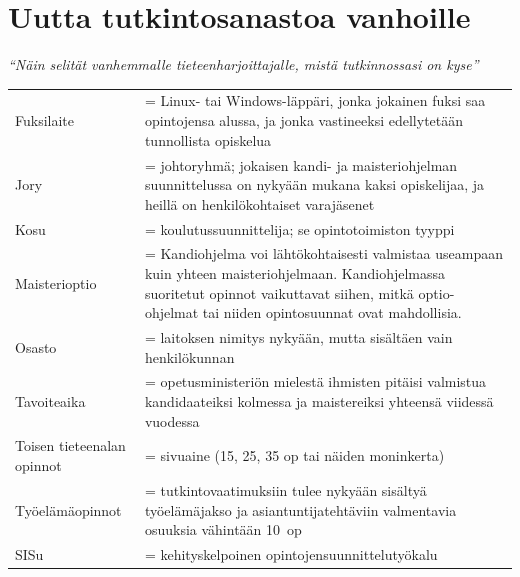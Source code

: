 \documentclass[a5paper, 8pt, twocolumn]{book} %
\numberwithin{equation}{section}
\begin{document}
\section{Uutta tutkintosanastoa vanhoille} {\small \itshape ``Näin selität vanhemmalle tieteenharjoittajalle, mistä tutkinnossasi on kyse''}\vspace{0.5cm}
\begin{table}[h!]
	\begin{tabularx}{\textwidth}{lX}
		Fuksilaite &= Linux- tai Windows-läppäri, jonka jokainen fuksi saa opintojensa alussa, ja jonka vastineeksi edellytetään tunnollista opiskelua\\[5pt]
		Jory &= johtoryhmä; jokaisen kandi- ja maisteriohjelman suunnittelussa on nykyään mukana kaksi opiskelijaa, ja heillä on henkilökohtaiset varajäsenet\\[5pt]
		Kosu &= koulutussuunnittelija; se opintotoimiston tyyppi\\[5pt]
		Maisterioptio &= Kandiohjelma voi lähtökohtaisesti valmistaa useampaan kuin yhteen maisteriohjelmaan. Kandiohjelmassa suoritetut opinnot vaikuttavat siihen, mitkä optio-ohjelmat tai niiden opintosuunnat ovat mahdollisia.\\[5pt]
		Osasto &= laitoksen nimitys nykyään, mutta sisältäen vain henkilökunnan\\[5pt]
		Tavoiteaika &= opetusministeriön mielestä ihmisten pitäisi valmistua
		kandidaateiksi kolmessa ja maistereiksi yhteensä viidessä vuodessa\\[5pt]
		Toisen tieteenalan opinnot &= sivuaine (15, 25, 35 op tai näiden moninkerta)\\[5pt]
		Työelämäopinnot &= tutkintovaatimuksiin tulee nykyään sisältyä työelämäjakso ja asiantuntijatehtäviin valmentavia osuuksia vähintään 10~op\\[5pt]
		SISu &= kehitys\-kelpoinen opintojen\-suunnittelu\-työkalu
\end{tabularx}
\end{table}
\twocolumn

\end{document}
